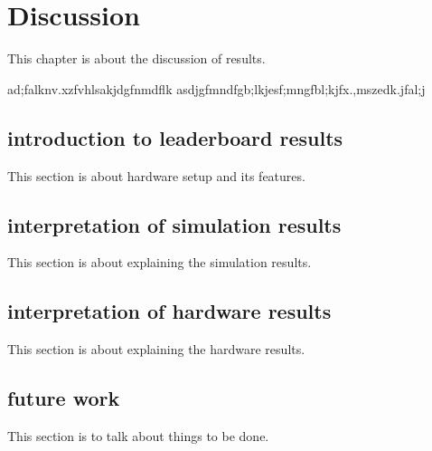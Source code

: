 \chapter{Discussion}
This chapter is about the discussion of results.

ad;falknv.xzfvhlsakjdgfnmdflk asdjgfmndfgb;lkjesf;mngfbl;kjfx.,mszedk.jfal;j

\section{introduction to leaderboard results}
This section is about hardware setup and its features.

\section{interpretation of simulation results}
This section is about explaining the simulation results.

\section{interpretation of hardware results}
This section is about explaining the hardware results.

\section{future work}
This section is to talk about things to be done.

\cleardoublepage
